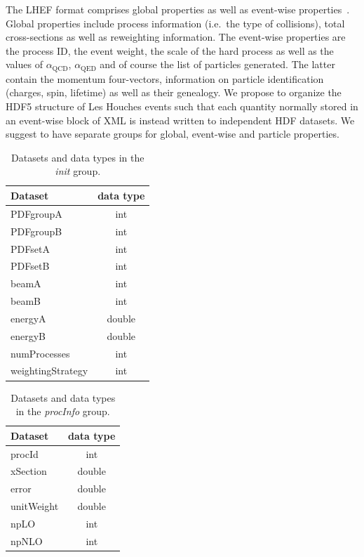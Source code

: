 \documentclass[aps,prd,twocolumn,fleqn,superscriptaddress,groupedaddress,nofootinbib,preprintnumbers]{revtex4}
\begin{document}
The LHEF format comprises global properties as well as event-wise
properties~\cite{Alwall:2006yp}. Global properties include process information
(i.e.\ the type of collisions), total cross-sections as well as reweighting information.
The event-wise properties are the process ID, the event weight, the scale of the
hard process as well as the values of $\alpha_\text{QCD}$, $\alpha_\text{QED}$
and of course the list of particles generated.  The latter contain the momentum four-vectors,
information on particle identification (charges, spin, lifetime) as well as their genealogy.
We propose to organize the HDF5 structure of Les Houches events such that each 
quantity normally stored in an event-wise block of XML is instead written
to independent HDF datasets. We suggest to have separate groups for global, 
event-wise and particle properties.

\begin{table}[t]
    \centering
    \begin{tabular}{lc}
        Dataset & data type \\ \toprule
    {\sc PDFgroupA} & int \\
    {\sc PDFgroupB} & int \\
    {\sc PDFsetA} & int \\
    {\sc PDFsetB} & int \\
    {\sc beamA}  & int \\
    {\sc beamB} & int \\
    {\sc energyA} & double \\
    {\sc energyB} & double \\
    {\sc numProcesses} & int \\
    {\sc weightingStrategy} & int \\
    \end{tabular}
    \caption{Datasets and data types in the {\it init} group.}
    \label{tab:group-init}
\end{table}
\begin{table}[t]
    \centering
    \begin{tabular}{lc}
        Dataset & data type \\ \toprule
    {\sc procId}     & int \\\bottomrule
    {\sc xSection}   & double\\
    {\sc error}      & double\\
    {\sc unitWeight} & double\\
    {\sc npLO} & int\\
    {\sc npNLO} & int \\
    \end{tabular}
    \caption{Datasets and data types in the {\it procInfo} group.}
    \label{tab:proc-info}
\end{table}
\end{document}

